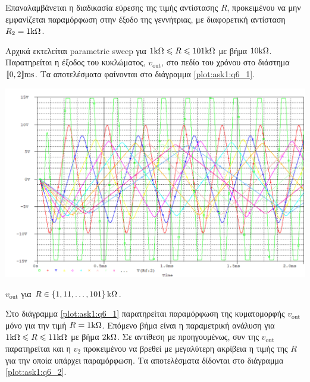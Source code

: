 Επαναλαμβάνεται η διαδικασία εύρεσης της τιμής αντίστασης $R$, προκειμένου να μην εμφανίζεται παραμόρφωση στην έξοδο της γεννήτριας, με διαφορετική αντίσταση $R_2 = 1\kohm$.\par
Αρχικά εκτελείται parametric sweep για $1\kohm\leqslant R\leqslant 101\kohm$ με βήμα $10\kohm$. Παρατηρείται η έξοδος του κυκλώματος, $v_{\mathrm{out}}$, στο πεδίο του χρόνου στο διάστημα $\lb 0,2 \rb\unit{\milli\second}$. Τα αποτελέσματα φαίνονται στο διάγραμμα \ref{plot:ask1:q6_1}.

\begin{plot_fig}[H]
	\begin{center}
		\includegraphics[width=15cm]{spice_01/1.6 a}
		\caption{$v_{\mathrm{out}}$ για $R\in\left\{1,11,\ldots,101\right\}\kohm$.}
		\label{plot:ask1:q6_1}
	\end{center}
\end{plot_fig}

Στο διάγραμμα \ref{plot:ask1:q6_1} παρατηρείται παραμόρφωση της κυματομορφής $v_{\mathrm{out}}$ μόνο για την τιμή $R=1\kohm$. Επόμενο βήμα είναι η παραμετρική ανάλυση για $1\kohm\leqslant R\leqslant 11\kohm$ με βήμα $2\kohm$. Σε αντίθεση με προηγουμένως, συν της $v_{\mathrm{out}}$ παρατηρείται και η $v_2$ προκειμένου να βρεθεί με μεγαλύτερη ακρίβεια η τιμής της $R$ για την οποία υπάρχει παραμόρφωση. Τα αποτελέσματα δίδονται στο διάγραμμα \ref{plot:ask1:q6_2}.

